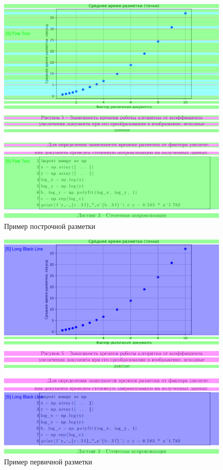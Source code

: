 \begin{figure}[H]
	\centering
	\includegraphics[width=\textwidth]{img/m.line.png}
    \caption{Пример построчной разметки}
	\label{fig:line}
\end{figure}

\begin{figure}[H]
	\centering
	\includegraphics[width=\textwidth]{img/m.prim.png}
    \caption{Пример первичной разметки}
	\label{fig:prim}
\end{figure}

